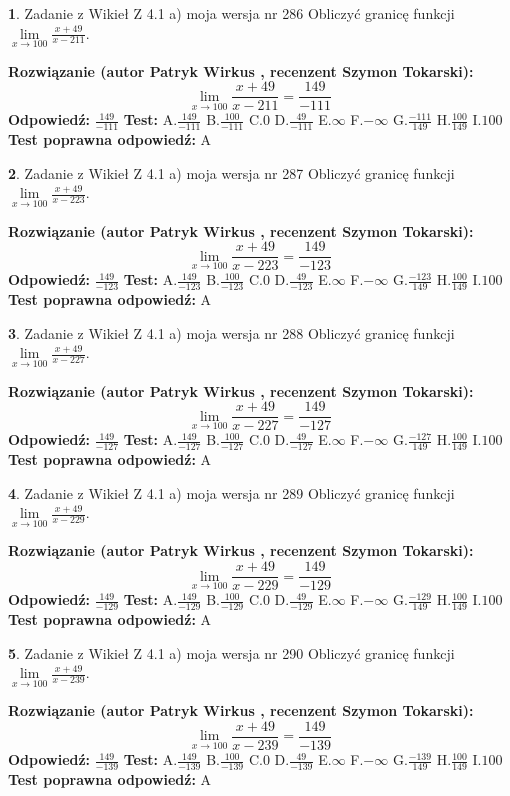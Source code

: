 \documentclass[12pt, a4paper]{article}
\theoremstyle{definition} %
\newtheorem{zad}{}
\newcommand{\zadStart}[1]{\begin{zad}#1\newline}
\newcommand{\zadStop}{\end{zad}}
\newcommand{\rozwStart}[2]{\noindent \textbf{Rozwiązanie (autor #1 , recenzent #2): }\newline}
\newcommand{\rozwStop}{\newline}
\newcommand{\odpStart}{\noindent \textbf{Odpowiedź:}\newline}
\newcommand{\odpStop}{\newline}
\newcommand{\testStart}{\noindent \textbf{Test:}\newline}
\newcommand{\testStop}{\newline}
\newcommand{\kluczStart}{\noindent \textbf{Test poprawna odpowiedź:}\newline}
\newcommand{\kluczStop}{\newline}
\begin{document}
\zadStart{Zadanie z Wikieł Z 4.1 a) moja wersja nr 286}
Obliczyć granicę funkcji $\lim\limits_{x\to100}\frac{x+49}{x-211}$.
\zadStop
\rozwStart{Patryk Wirkus}{Szymon Tokarski}
$$\lim\limits_{x\to100}\frac{x+49}{x-211} = \frac{149}{-111}$$
\rozwStop
\odpStart
$\frac{149}{-111}$
\odpStop
\testStart
A.$\frac{149}{-111}$
B.$\frac{100}{-111}$
C.$0$
D.$\frac{49}{-111}$
E.$\infty$
F.$-\infty$
G.$\frac{-111}{149}$
H.$\frac{100}{149}$
I.$100$
\testStop
\kluczStart
A
\kluczStop



\zadStart{Zadanie z Wikieł Z 4.1 a) moja wersja nr 287}
Obliczyć granicę funkcji $\lim\limits_{x\to100}\frac{x+49}{x-223}$.
\zadStop
\rozwStart{Patryk Wirkus}{Szymon Tokarski}
$$\lim\limits_{x\to100}\frac{x+49}{x-223} = \frac{149}{-123}$$
\rozwStop
\odpStart
$\frac{149}{-123}$
\odpStop
\testStart
A.$\frac{149}{-123}$
B.$\frac{100}{-123}$
C.$0$
D.$\frac{49}{-123}$
E.$\infty$
F.$-\infty$
G.$\frac{-123}{149}$
H.$\frac{100}{149}$
I.$100$
\testStop
\kluczStart
A
\kluczStop



\zadStart{Zadanie z Wikieł Z 4.1 a) moja wersja nr 288}
Obliczyć granicę funkcji $\lim\limits_{x\to100}\frac{x+49}{x-227}$.
\zadStop
\rozwStart{Patryk Wirkus}{Szymon Tokarski}
$$\lim\limits_{x\to100}\frac{x+49}{x-227} = \frac{149}{-127}$$
\rozwStop
\odpStart
$\frac{149}{-127}$
\odpStop
\testStart
A.$\frac{149}{-127}$
B.$\frac{100}{-127}$
C.$0$
D.$\frac{49}{-127}$
E.$\infty$
F.$-\infty$
G.$\frac{-127}{149}$
H.$\frac{100}{149}$
I.$100$
\testStop
\kluczStart
A
\kluczStop



\zadStart{Zadanie z Wikieł Z 4.1 a) moja wersja nr 289}
Obliczyć granicę funkcji $\lim\limits_{x\to100}\frac{x+49}{x-229}$.
\zadStop
\rozwStart{Patryk Wirkus}{Szymon Tokarski}
$$\lim\limits_{x\to100}\frac{x+49}{x-229} = \frac{149}{-129}$$
\rozwStop
\odpStart
$\frac{149}{-129}$
\odpStop
\testStart
A.$\frac{149}{-129}$
B.$\frac{100}{-129}$
C.$0$
D.$\frac{49}{-129}$
E.$\infty$
F.$-\infty$
G.$\frac{-129}{149}$
H.$\frac{100}{149}$
I.$100$
\testStop
\kluczStart
A
\kluczStop



\zadStart{Zadanie z Wikieł Z 4.1 a) moja wersja nr 290}
Obliczyć granicę funkcji $\lim\limits_{x\to100}\frac{x+49}{x-239}$.
\zadStop
\rozwStart{Patryk Wirkus}{Szymon Tokarski}
$$\lim\limits_{x\to100}\frac{x+49}{x-239} = \frac{149}{-139}$$
\rozwStop
\odpStart
$\frac{149}{-139}$
\odpStop
\testStart
A.$\frac{149}{-139}$
B.$\frac{100}{-139}$
C.$0$
D.$\frac{49}{-139}$
E.$\infty$
F.$-\infty$
G.$\frac{-139}{149}$
H.$\frac{100}{149}$
I.$100$
\testStop
\kluczStart
A
\kluczStop
\end{document}
